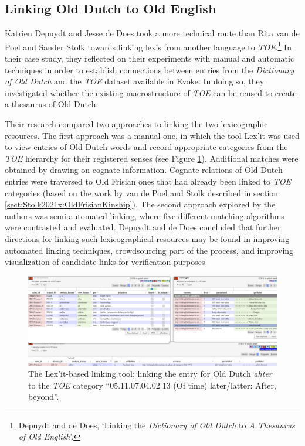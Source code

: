 \subsection{Linking Old Dutch to Old English}

Katrien Depuydt and Jesse de Does took a more technical route than Rita van de Poel and Sander Stolk towards linking lexis from another language to \textit{TOE}.\footnote{Depuydt and de Does, `Linking the \textit{Dictionary of Old Dutch} to \textit{A Thesaurus of Old English}'.} In their case study, they reflected on their experiments with manual and automatic techniques in order to establish connections between entries from the \textit{Dictionary of Old Dutch} and the \textit{TOE} dataset available in Evoke. In doing so, they investigated whether the existing macrostructure of \textit{TOE} can be reused to create a thesaurus of Old Dutch. %

Their research compared two approaches to linking the two lexicographic resources. The first approach was a manual one, in which the tool Lex'it was used to view entries of Old Dutch words and record appropriate categories from the \textit{TOE} hierarchy for their registered senses (see Figure \ref{fig:Stolk2021x:Depuydt-fig1}). Additional matches were obtained by drawing on cognate information. Cognate relations of Old Dutch entries were traversed to Old Frisian ones that had already been linked to \textit{TOE} categories (based on the work by van de Poel and Stolk described in section \ref{sect:Stolk2021x:OldFrisianKinship}). The second approach explored by the authors was semi-automated linking, where five different matching algorithms were contrasted and evaluated. Depuydt and de Does concluded that further directions for linking such lexicographical resources may be found in improving automated linking techniques, crowdsourcing part of the process, and improving visualization of candidate links for verification purposes.

\begin{figure}[h]
    \includegraphics[width=\textwidth]{Stolk2021x/fig/Depuydt-lexit-b.png}
	\caption[]{\label{fig:Stolk2021x:Depuydt-fig1}The Lex'it-based linking tool; linking the entry for Old Dutch \textit{ahter} to the \textit{TOE} category ``05.11.07.04.02|13 (Of time) later/latter: After, beyond''.}
\end{figure}

